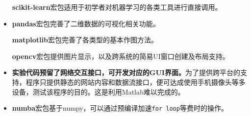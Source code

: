 \begin{itemize}
\textbf{scikit-learn}宏包适用于初学者对机器学习的各类工具进行直接调用。

\item \textbf{pandas}宏包完善了二维数据的可视化相关功能。\cite{GeeksForGeeks_2020}

\textbf{matplotlib}宏包完善了各类型的基本作图方法。

\textbf{opencv}宏包提供图片显示，以及跨系统的简易UI窗口创建及布局支持。

\item \textbf{实验代码预留了网络交互接口，可开发对应的GUI界面。}为了提供跨平台的支持，程序只提供静态的网站内容和数据流接口，便可达成使用手机摄像头等多设备，测试该程序的目的。这是利用Matlab难以完成的。

\item \textbf{numba}宏包基于numpy，可以通过预编译加速\verb|for loop|等费时的操作。
\end{itemize}